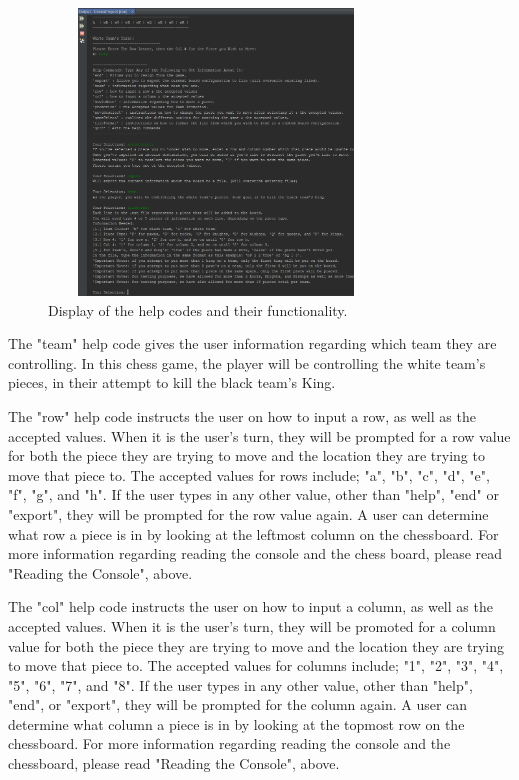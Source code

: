 \documentclass[conference]{IEEEtran}
\begin{document}
\begin{figure}[t!]
	\centering
	\includegraphics[clip,trim=1cm 3.5cm 0cm 3cm, width=3.5in, height=3in]{ss_helpcodes}
	\caption{Display of the help codes and their functionality.}
	\label{fig:helpcodes}
\end{figure}

The "team" help code gives the user information regarding which team they are controlling. In this chess game, the player will be controlling the white team's pieces, in their attempt to kill the black team's King.

The "row" help code instructs the user on how to input a row, as well as the accepted values. When it is the user's turn, they will be prompted for a row value for both the piece they are trying to move and the location they are trying to move that piece to. The accepted values for rows include; "a", "b", "c", "d", "e", "f", "g", and "h". If the user types in any other value, other than "help", "end" or "export", they will be prompted for the row value again. A user can determine what row a piece is in by looking at the leftmost column on the chessboard. For more information regarding reading the console and the chess board, please read "Reading the Console", above.

The "col" help code instructs the user on how to input a column, as well as the accepted values. When it is the user's turn, they will be promoted for a column value for both the piece they are trying to move and the location they are trying to move that piece to. The accepted values for columns include; "1", "2", "3", "4", "5", "6", "7", and "8". If the user types in any other value, other than "help", "end", or "export", they will be prompted for the column again. A user can determine what column a piece is in by looking at the topmost row on the chessboard. For more information regarding reading the console and the chessboard, please read "Reading the Console", above. 
\end{document}
